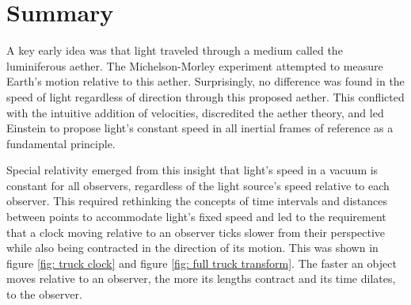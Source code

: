



\section{Summary}

A key early idea was that light traveled through a medium called the luminiferous aether. The Michelson-Morley experiment attempted to measure Earth's motion relative to this aether. Surprisingly, no difference was found in the speed of light regardless of direction through this proposed aether. This conflicted with the intuitive addition of velocities, discredited the aether theory, and led Einstein to propose light's constant speed in all inertial frames of reference as a fundamental principle.

Special relativity emerged from this insight that light's speed in a vacuum is constant for all observers, regardless of the light source's speed relative to each observer. This required rethinking the concepts of time intervals and distances between points to accommodate light's fixed speed and led to the requirement that a clock moving relative to an observer ticks slower from their perspective while also being contracted in the direction of its motion. This was shown in figure \ref{fig: truck clock} and figure \ref{fig: full truck transform}. The faster an object moves relative to an observer, the more its lengths contract and its time dilates, to the observer.

